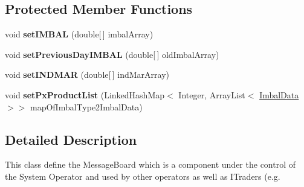 \subsection*{Protected Member Functions}
\begin{DoxyCompactItemize}
\item 
\hypertarget{classuk_1_1ac_1_1dmu_1_1iesd_1_1cascade_1_1market_1_1astem_1_1operators_1_1_market_message_board_a411d8b919efcb81a5d9a788508c0f63c}{void {\bfseries set\-I\-M\-B\-A\-L} (double\mbox{[}$\,$\mbox{]} imbal\-Array)}\label{classuk_1_1ac_1_1dmu_1_1iesd_1_1cascade_1_1market_1_1astem_1_1operators_1_1_market_message_board_a411d8b919efcb81a5d9a788508c0f63c}

\item 
\hypertarget{classuk_1_1ac_1_1dmu_1_1iesd_1_1cascade_1_1market_1_1astem_1_1operators_1_1_market_message_board_a8b90e16103be23393289ffc952e2f266}{void {\bfseries set\-Previous\-Day\-I\-M\-B\-A\-L} (double\mbox{[}$\,$\mbox{]} old\-Imbal\-Array)}\label{classuk_1_1ac_1_1dmu_1_1iesd_1_1cascade_1_1market_1_1astem_1_1operators_1_1_market_message_board_a8b90e16103be23393289ffc952e2f266}

\item 
\hypertarget{classuk_1_1ac_1_1dmu_1_1iesd_1_1cascade_1_1market_1_1astem_1_1operators_1_1_market_message_board_a74337e602fccf6cf92e09f212e73e84f}{void {\bfseries set\-I\-N\-D\-M\-A\-R} (double\mbox{[}$\,$\mbox{]} ind\-Mar\-Array)}\label{classuk_1_1ac_1_1dmu_1_1iesd_1_1cascade_1_1market_1_1astem_1_1operators_1_1_market_message_board_a74337e602fccf6cf92e09f212e73e84f}

\item 
\hypertarget{classuk_1_1ac_1_1dmu_1_1iesd_1_1cascade_1_1market_1_1astem_1_1operators_1_1_market_message_board_a78b3932aff558dd452f2eed6e2df8197}{void {\bfseries set\-Px\-Product\-List} (Linked\-Hash\-Map$<$ Integer, Array\-List$<$ \hyperlink{classuk_1_1ac_1_1dmu_1_1iesd_1_1cascade_1_1market_1_1astem_1_1data_1_1_imbal_data}{Imbal\-Data} $>$$>$ map\-Of\-Imbal\-Type2\-Imbal\-Data)}\label{classuk_1_1ac_1_1dmu_1_1iesd_1_1cascade_1_1market_1_1astem_1_1operators_1_1_market_message_board_a78b3932aff558dd452f2eed6e2df8197}

\end{DoxyCompactItemize}


\subsection{Detailed Description}
This class define the Message\-Board which is a component under the control of the System Operator and used by other operators as well as I\-Traders (e.\-g. 

